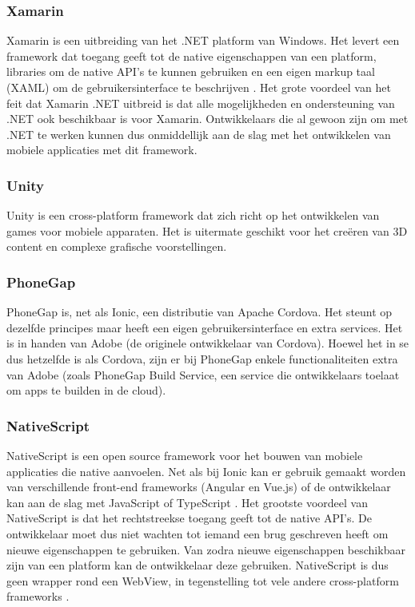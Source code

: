 \subsubsection{Xamarin}
\label{subsubsec:Xamarin}

Xamarin is een uitbreiding van het .NET platform van Windows. Het levert een framework dat toegang geeft tot de native eigenschappen van een platform, libraries om de native API's te kunnen gebruiken en een eigen markup taal (XAML) om de gebruikersinterface te beschrijven \autocite{Microsoft2020}. Het grote voordeel van het feit dat Xamarin .NET uitbreid is dat alle mogelijkheden en ondersteuning van .NET ook beschikbaar is voor Xamarin. Ontwikkelaars die al gewoon zijn om met .NET te werken kunnen dus onmiddellijk aan de slag met het ontwikkelen van mobiele applicaties met dit framework.

\subsubsection{Unity}
\label{subsubsec:Unity}

Unity is een cross-platform framework dat zich richt op het ontwikkelen van games voor mobiele apparaten. Het is uitermate geschikt voor het creëren van 3D content en complexe grafische voorstellingen. 

\subsubsection{PhoneGap}
\label{subsubsec:PhoneGap}

PhoneGap is, net als Ionic, een distributie van Apache Cordova. Het steunt op dezelfde principes maar heeft een eigen gebruikersinterface en extra services. Het is in handen van Adobe (de originele ontwikkelaar van Cordova). Hoewel het in se dus hetzelfde is als Cordova, zijn er bij PhoneGap enkele functionaliteiten extra van Adobe (zoals PhoneGap Build Service, een service die ontwikkelaars toelaat om apps te builden in de cloud).

\subsubsection{NativeScript} 
\label{subsubsec:NativeScript}

NativeScript is een open source framework voor het bouwen van mobiele applicaties die native aanvoelen. Net als bij Ionic kan er gebruik gemaakt worden van verschillende front-end frameworks (Angular en Vue.js) of de ontwikkelaar kan aan de slag met JavaScript of TypeScript \autocite{NativeScript2020}. Het grootste voordeel van NativeScript is dat het rechtstreekse toegang geeft tot de native API's. De ontwikkelaar moet dus niet wachten tot iemand een brug geschreven heeft om nieuwe eigenschappen te gebruiken. Van zodra nieuwe eigenschappen beschikbaar zijn van een platform kan de ontwikkelaar deze gebruiken. NativeScript is dus geen wrapper rond een WebView, in tegenstelling tot vele andere cross-platform frameworks \autocite{Anderson2016}.

